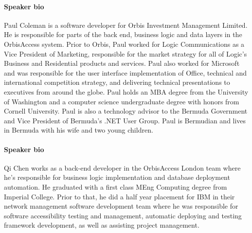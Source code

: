 \documentclass{article}
\begin{document}
\paragraph{Speaker bio}
Paul Coleman is a software developer for Orbis Investment Management
Limited.  He is responsible for parts of the back end, business logic
and data layers in the OrbisAccess system.
%
Prior to Orbis, Paul worked for Logic Communications as a Vice President
of Marketing, responsible for the market strategy for all of Logic's
Business and Residential products and services.
%
Paul also worked for Microsoft and was responsible for the user
interface implementation of Office, technical and international
competition strategy, and delivering technical presentations to
executives from around the globe.
%
Paul holds an MBA degree from the University of Washington and a
computer science undergraduate degree with honors from Cornell
University.  Paul is also a technology advisor to the Bermuda
Government and Vice President of Bermuda's .NET User Group.
%
Paul is Bermudian and lives in Bermuda with his wife and two young children.

\paragraph{Speaker bio} 
Qi Chen works as a back-end developer in the OrbisAccess London team
where he's responsible for business logic implementation and database
deployment automation.
%
He graduated with a first class MEng Computing degree from Imperial
College.
%
Prior to that, he did a half year placement for IBM in their network
management software development team where he was responsible for
software accessibility testing and management, automatic deploying and
testing framework development, as well as assisting project
management.
\end{document}
